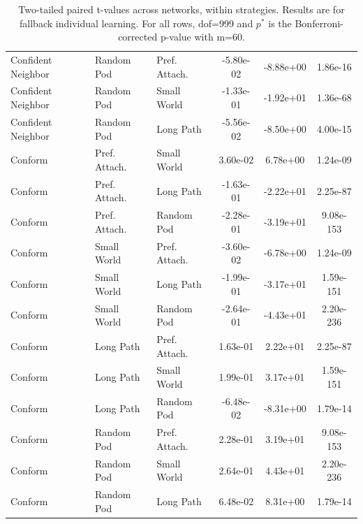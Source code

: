 \documentclass[twocolumn,10pt]{article}
\begin{document}
\begin{table}[]
\begin{tabular}{l|ll|ccc}
Confident Neighbor&Random Pod&Pref. Attach.&-5.80e-02&-8.88e+00&1.86e-16\\
Confident Neighbor&Random Pod&Small World&-1.33e-01&-1.92e+01&1.36e-68\\
Confident Neighbor&Random Pod&Long Path&-5.56e-02&-8.50e+00&4.00e-15\\
\hline
Conform&Pref. Attach.&Small World&3.60e-02&6.78e+00&1.24e-09\\
Conform&Pref. Attach.&Long Path&-1.63e-01&-2.22e+01&2.25e-87\\
Conform&Pref. Attach.&Random Pod&-2.28e-01&-3.19e+01&9.08e-153\\
Conform&Small World&Pref. Attach.&-3.60e-02&-6.78e+00&1.24e-09\\
Conform&Small World&Long Path&-1.99e-01&-3.17e+01&1.59e-151\\
Conform&Small World&Random Pod&-2.64e-01&-4.43e+01&2.20e-236\\
Conform&Long Path&Pref. Attach.&1.63e-01&2.22e+01&2.25e-87\\
Conform&Long Path&Small World&1.99e-01&3.17e+01&1.59e-151\\
Conform&Long Path&Random Pod&-6.48e-02&-8.31e+00&1.79e-14\\
Conform&Random Pod&Pref. Attach.&2.28e-01&3.19e+01&9.08e-153\\
Conform&Random Pod&Small World&2.64e-01&4.43e+01&2.20e-236\\
Conform&Random Pod&Long Path&6.48e-02&8.31e+00&1.79e-14\\
\hline
    \end{tabular}
    \caption{Two-tailed paired t-values across networks, within strategies. Results are for fallback individual learning. For all rows, dof=999 and $p^*$ is the Bonferroni-corrected p-value with m=60.}
    \label{tab:my_label}
\end{table}
\end{document}
